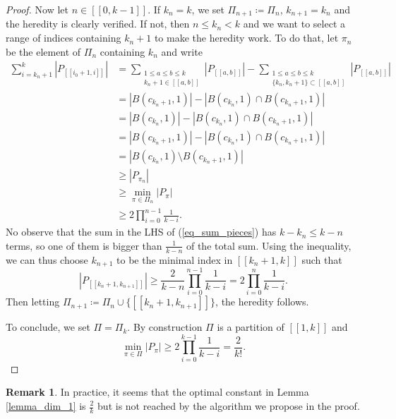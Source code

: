 \documentclass[a4paper, 11pt]{article}
\theoremstyle{plain}
\theoremstyle{definition}
\newtheorem{Remark}[Theorem]{Remark}
\newcommand{\range}[2]{[\![#1,#2]\!]}
\numberwithin{equation}{section}
\begin{document}
\begin{proof}
    Now let $n\in\range{0}{k-1}$. If $k_n=k$, we set $\Pi_{n+1}\coloneqq\Pi_n$, $k_{n+1}=k_n$ and the heredity is clearly verified. If not, then $n\leq k_n<k$ and we want to select a range of indices containing $k_n+1$ to make the heredity work. To do that, let $\pi_n$ be the element of $\Pi_n$ containing $k_n$ and write
        \begin{equation}
            \label{eq_sum_pieces}
            \begin{split}
                \sum_{i=k_n+1}^k|P_{\range{i_0+1}{i}}|&=\sum_{\substack{1\leq a\leq b\leq k\\k_n+1\in\range{a}{b}}}|P_{\range{a}{b}}|-\sum_{\substack{1\leq a\leq b\leq k\\\{k_n,k_n+1\}\subset\range{a}{b}}}|P_{\range{a}{b}}|\\
                &=|B(c_{k_n+1}, 1)|-|B(c_{k_n}, 1)\cap B(c_{k_n+1}, 1)|\\
                &=|B(c_{k_n}, 1)|-|B(c_{k_n}, 1)\cap B(c_{k_n+1}, 1)|\\
                &=|B(c_{k_n+1}, 1)|-|B(c_{k_n}, 1)\cap B(c_{k_n+1}, 1)|\\
                &=|B(c_{k_n}, 1)\setminus B(c_{k_n+1}, 1)|\\
                &\geq |P_{\pi_n}|\\
                &\geq \min_{\pi\in\Pi_n}|P_\pi|\\
                &\geq2\prod_{i=0}^{n-1}\frac{1}{k-i}.
            \end{split}
        \end{equation}
    No observe that the sum in the LHS of (\ref{eq_sum_pieces}) has $k-k_n\leq k-n$ terms, so one of them is bigger than $\frac{1}{k-n}$ of the total sum. Using the inequality, we can thus choose $k_{n+1}$ to be the minimal index in $\range{k_n+1}{k}$ such that 
        $$|P_{\range{k_n+1}{k_{n+1}}}|\geq\frac{2}{k-n}\prod_{i=0}^{n-1}\frac{1}{k-i}=2\prod_{i=0}^{n}\frac{1}{k-i}.$$
    Then letting $\Pi_{n+1}\coloneqq\Pi_n\cup\{\range{k_n+1}{k_{n+1}}\}$, the heredity follows.
    
    To conclude, we set $\Pi=\Pi_k$. By construction $\Pi$ is a partition of $\range{1}{k}$ and 
        $$\min_{\pi\in\Pi}|P_\pi|\geq2\prod_{i=0}^{k-1}\frac{1}{k-i}=\frac{2}{k!}.$$
\end{proof}


\begin{Remark}
    In practice, it seems that the optimal constant in Lemma \ref{lemma_dim_1} is $\frac{2}{k}$ but is not reached by the algorithm we propose in the proof.
\end{Remark}
\end{document}
